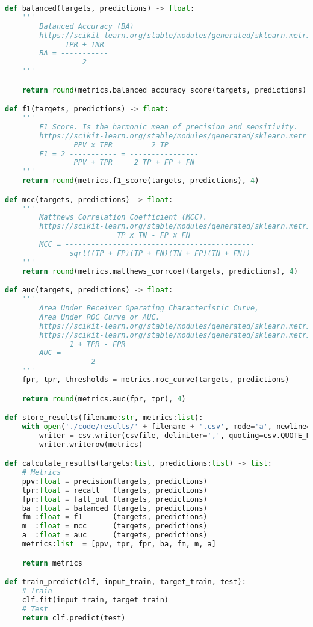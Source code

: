 \begin{lstlisting}[language=Python, caption={Load datasets, calculate metrics, 
export results to CSV files, etc.}, label={lst:data}]
def balanced(targets, predictions) -> float:
    '''
        Balanced Accuracy (BA)
        https://scikit-learn.org/stable/modules/generated/sklearn.metrics.balanced_accuracy_score.html#sklearn.metrics.balanced_accuracy_score
              TPR + TNR
        BA = -----------
                  2
    '''

    return round(metrics.balanced_accuracy_score(targets, predictions), 4)

def f1(targets, predictions) -> float:
    '''
        F1 Score. Is the harmonic mean of precision and sensitivity.
        https://scikit-learn.org/stable/modules/generated/sklearn.metrics.f1_score.html
                PPV x TPR         2 TP
        F1 = 2 ----------- = ----------------
                PPV + TPR     2 TP + FP + FN
    '''
    return round(metrics.f1_score(targets, predictions), 4)

def mcc(targets, predictions) -> float:
    '''
        Matthews Correlation Coefficient (MCC).
        https://scikit-learn.org/stable/modules/generated/sklearn.metrics.matthews_corrcoef.html
                          TP x TN - FP x FN
        MCC = --------------------------------------------
               sqrt((TP + FP)(TP + FN)(TN + FP)(TN + FN))
    '''
    return round(metrics.matthews_corrcoef(targets, predictions), 4)

def auc(targets, predictions) -> float:
    '''
        Area Under Receiver Operating Characteristic Curve, 
        Area Under ROC Curve or AUC.
        https://scikit-learn.org/stable/modules/generated/sklearn.metrics.roc_curve.html
        https://scikit-learn.org/stable/modules/generated/sklearn.metrics.auc.html
               1 + TPR - FPR
        AUC = ---------------
                    2
    '''
    fpr, tpr, thresholds = metrics.roc_curve(targets, predictions)

    return round(metrics.auc(fpr, tpr), 4)

def store_results(filename:str, metrics:list):
    with open('./code/results/' + filename + '.csv', mode='a', newline='') as csvfile:
        writer = csv.writer(csvfile, delimiter=',', quoting=csv.QUOTE_MINIMAL)
        writer.writerow(metrics)

def calculate_results(targets:list, predictions:list) -> list:
    # Metrics
    ppv:float = precision(targets, predictions) 
    tpr:float = recall   (targets, predictions)
    fpr:float = fall_out (targets, predictions)
    ba :float = balanced (targets, predictions)
    fm :float = f1       (targets, predictions)
    m  :float = mcc      (targets, predictions)
    a  :float = auc      (targets, predictions)
    metrics:list  = [ppv, tpr, fpr, ba, fm, m, a]

    return metrics

def train_predict(clf, input_train, target_train, test):
    # Train
    clf.fit(input_train, target_train)
    # Test
    return clf.predict(test)
\end{lstlisting}


